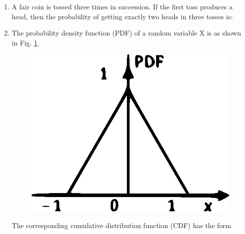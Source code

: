 \documentclass[journal,12pt,twocolumn]{IEEEtran}
\begin{document}
\begin{enumerate}
\begin{enumerate}
\end{enumerate}
%
\solution

\item A fair coin is tossed three times in succession. If the first toss produces a head, then the probability of getting exactly two heads in three tosses is:

\begin{enumerate}
\end{enumerate}

\item The probability density function (PDF) of a random variable X is as shown in Fig. \ref{fig:2}.
\begin{figure}[!h]
\includegraphics[width=\columnwidth]{./figs/figure2.eps}
\caption{}
\label{fig:2}
\end{figure}

The corresponding cumulative distribution function (CDF) has the form\\

\begin{enumerate}
\begin{multicols}{2}
\setlength\itemsep{4em}


\end{multicols}
\end{enumerate}
\end{enumerate}
\end{document}
